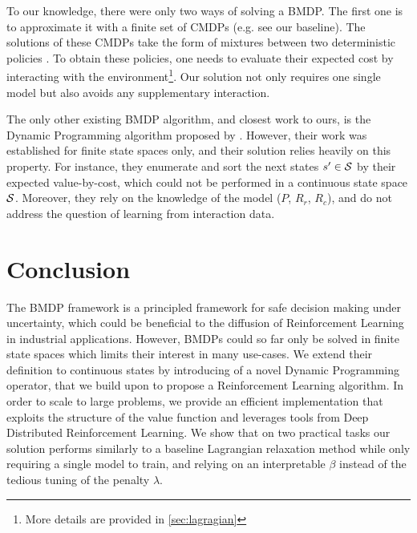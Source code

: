 To our knowledge, there were only two ways of solving a BMDP. The first one is to approximate it with a finite set of CMDPs (e.g. see our \FTQl baseline). The solutions of these CMDPs take the form of mixtures between two deterministic policies \citep[Theorem 4.4,][]{BEUTLER1985236}. To obtain these policies, one needs to evaluate their expected cost by interacting with the environment\footnote{More details are provided in \autoref{sec:lagragian}}. Our solution not only requires one single model but also avoids any supplementary interaction.

The only other existing BMDP algorithm, and closest work to ours, is the Dynamic Programming algorithm proposed by \citet{Boutilier_Lu:uai16}. However, their work was established for finite state spaces only, and their solution relies heavily on this property. For instance, they enumerate and sort the next states $s'\in\mathcal{S}$ by their expected value-by-cost, which could not be performed in a continuous state space $\mathcal{S}$. Moreover, they rely on the knowledge of the model ($P$, $R_r$, $R_c$), and do not address the question of learning from interaction data.

\section*{Conclusion}
\label{sec:conclusion}
The BMDP framework is a principled framework for safe decision making under uncertainty, which could be beneficial to the diffusion of Reinforcement Learning in industrial applications. However, BMDPs could so far only be solved in finite state spaces which limits their interest in many use-cases. We extend their definition to continuous states by introducing of a novel Dynamic Programming operator, that we build upon to propose a Reinforcement Learning algorithm. In order to scale to large problems, we provide an efficient implementation that exploits the structure of the value function and leverages tools from Deep Distributed Reinforcement Learning. We show that on two practical tasks our solution performs similarly to a baseline Lagrangian relaxation method while only requiring a single model to train, and relying on an interpretable $\beta$ instead of the tedious tuning of the penalty $\lambda$.




